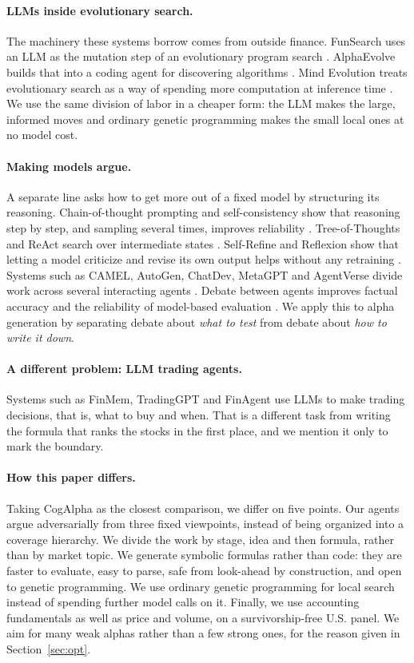 \documentclass{article}
\theoremstyle{definition}
\theoremstyle{plain}
\theoremstyle{remark}
\begin{document}
\paragraph{LLMs inside evolutionary search.} The machinery these systems borrow comes
from outside finance. FunSearch uses an LLM as the mutation step of an evolutionary
program search \cite{funsearch}. AlphaEvolve builds that into a coding agent for
discovering algorithms \cite{alphaevolve-dm}. Mind Evolution treats evolutionary
search as a way of spending more computation at inference time \cite{mindevo}. We use the
same division of labor in a cheaper form: the LLM makes the large, informed moves and
ordinary genetic programming \cite{deap} makes the small local ones at no model cost.

\paragraph{Making models argue.} A separate line asks how to get more out of a fixed
model by structuring its reasoning. Chain-of-thought prompting and self-consistency show
that reasoning step by step, and sampling several times, improves reliability
\cite{cot,selfconsistency}. Tree-of-Thoughts and ReAct search over intermediate states
\cite{tot,react}. Self-Refine and Reflexion show that letting a model criticize and
revise its own output helps without any retraining \cite{selfrefine,reflexion}. Systems
such as CAMEL, AutoGen, ChatDev, MetaGPT and AgentVerse divide work across several
interacting agents \cite{camel,autogen,chatdev,metagpt,agentverse}. Debate between agents
improves factual accuracy \cite{du-debate} and the reliability of model-based evaluation
\cite{chateval}. We apply this to alpha generation by separating
debate about \emph{what to test} from debate about \emph{how to write it down}.

\paragraph{A different problem: LLM trading agents.} Systems such as FinMem, TradingGPT
and FinAgent use LLMs to make trading decisions, that is, what to buy and when. That is a
different task from writing the formula that ranks the stocks in the first place, and we
mention it only to mark the boundary.

\paragraph{How this paper differs.} Taking CogAlpha as the closest comparison, we differ
on five points. Our agents argue adversarially from three fixed viewpoints, instead of
being organized into a coverage hierarchy. We divide the work by stage, idea and then
formula, rather than by market topic. We generate symbolic formulas rather than code:
they are faster to evaluate, easy to parse, safe from look-ahead by construction, and
open to genetic programming. We use ordinary genetic programming for local search instead
of spending further model calls on it. Finally, we use accounting fundamentals as well as
price and volume, on a survivorship-free U.S. panel. We aim for many weak alphas rather
than a few strong ones, for the reason given in Section~\ref{sec:opt}.
\end{document}
